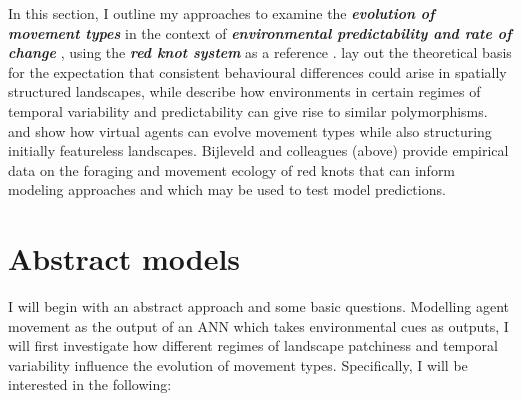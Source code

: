 In this section, I outline my approaches to examine the
\textbf{\emph{evolution of movement types}}
\citep[\emph{sensu}][]{wolf2010, getz2015} in the context of
\textbf{\emph{environmental predictability and rate of change}}
\citep[as in][]{botero2015}, using the \textbf{\emph{red knot system}}
as a reference
\citep{bijleveld2012a, bijleveld2014, bijleveld2015, bijleveld2015a, oudman2016, oudman2018}.
\citet{wolf2010} lay out the theoretical basis for the expectation that
consistent behavioural differences could arise in spatially structured
landscapes, while \citet{botero2015} describe how environments in
certain regimes of temporal variability and predictability can give rise
to similar polymorphisms. \citet{getz2015} and \citet{netz2017} show how
virtual agents can evolve movement types while also structuring
initially featureless landscapes. Bijleveld and colleagues (above)
provide empirical data on the foraging and movement ecology of red knots
that can inform modeling approaches and which may be used to test model
predictions.

\section{Abstract models}

I will begin with an abstract approach and some basic questions.
Modelling agent movement as the output of an ANN which takes
environmental cues as outputs, I will first investigate how different
regimes of landscape patchiness and temporal variability influence the
evolution of movement types. Specifically, I will be interested in the
following:

